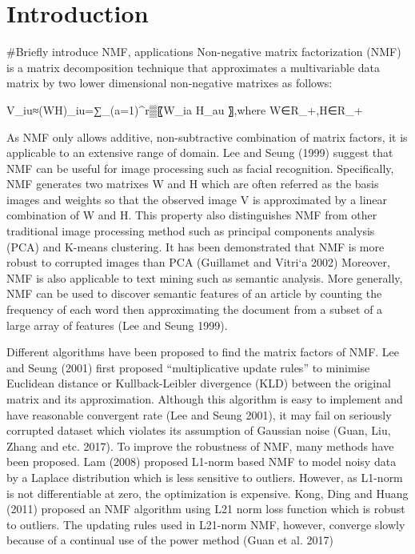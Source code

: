 \section{Introduction\label{chapter1}}
#Briefly introduce NMF, applications
Non-negative matrix factorization (NMF) is a matrix decomposition technique that approximates a multivariable data matrix by two lower dimensional non-negative matrixes as follows:

V_iu≈(WH)_iu=∑_(a=1)^r▒〖W_ia H_au 〗,where W∈R_+,H∈R_+

As NMF only allows additive, non-subtractive combination of matrix factors, it is applicable to an extensive range of domain. Lee and Seung (1999) suggest that NMF can be useful for image processing such as facial recognition. Specifically, NMF generates two matrixes W and H which are often referred as the basis images and weights so that the observed image V is approximated by a linear combination of W and H. This property also distinguishes NMF from other traditional image processing method such as principal components analysis (PCA) and K-means clustering. It has been demonstrated that NMF is more robust to corrupted images than PCA (Guillamet and Vitri`a 2002)
Moreover, NMF is also applicable to text mining such as semantic analysis. More generally, NMF can be used to discover semantic features of an article by counting the frequency of each word then approximating the document from a subset of a large array of features (Lee and Seung 1999). 

Different algorithms have been proposed to find the matrix factors of NMF. Lee and Seung (2001) first proposed “multiplicative update rules” to minimise Euclidean distance or Kullback-Leibler divergence (KLD) between the original matrix and its approximation. Although this algorithm is easy to implement and have reasonable convergent rate (Lee and Seung 2001), it may fail on seriously corrupted dataset which violates its assumption of Gaussian noise (Guan, Liu, Zhang and etc. 2017).  To improve the robustness of NMF, many methods have been proposed. Lam (2008) proposed L1-norm based NMF to model noisy data by a Laplace distribution which is less sensitive to outliers. However, as L1-norm is not differentiable at zero, the optimization is expensive. Kong, Ding and Huang (2011) proposed an NMF algorithm using L21 norm loss function which is robust to outliers. The updating rules used in L21-norm NMF, however, converge slowly because of a continual use of the power method (Guan et al. 2017)  

